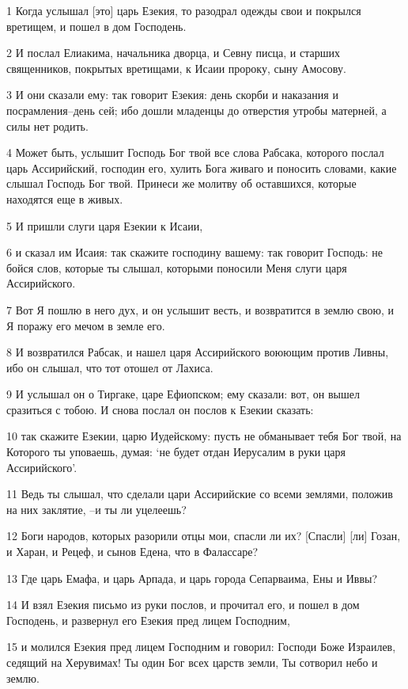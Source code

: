 \par 1 Когда услышал [это] царь Езекия, то разодрал одежды свои и покрылся вретищем, и пошел в дом Господень.
\par 2 И послал Елиакима, начальника дворца, и Севну писца, и старших священников, покрытых вретищами, к Исаии пророку, сыну Амосову.
\par 3 И они сказали ему: так говорит Езекия: день скорби и наказания и посрамления--день сей; ибо дошли младенцы до отверстия утробы матерней, а силы нет родить.
\par 4 Может быть, услышит Господь Бог твой все слова Рабсака, которого послал царь Ассирийский, господин его, хулить Бога живаго и поносить словами, какие слышал Господь Бог твой. Принеси же молитву об оставшихся, которые находятся еще в живых.
\par 5 И пришли слуги царя Езекии к Исаии,
\par 6 и сказал им Исаия: так скажите господину вашему: так говорит Господь: не бойся слов, которые ты слышал, которыми поносили Меня слуги царя Ассирийского.
\par 7 Вот Я пошлю в него дух, и он услышит весть, и возвратится в землю свою, и Я поражу его мечом в земле его.
\par 8 И возвратился Рабсак, и нашел царя Ассирийского воюющим против Ливны, ибо он слышал, что тот отошел от Лахиса.
\par 9 И услышал он о Тиргаке, царе Ефиопском; ему сказали: вот, он вышел сразиться с тобою. И снова послал он послов к Езекии сказать:
\par 10 так скажите Езекии, царю Иудейскому: пусть не обманывает тебя Бог твой, на Которого ты уповаешь, думая: `не будет отдан Иерусалим в руки царя Ассирийского'.
\par 11 Ведь ты слышал, что сделали цари Ассирийские со всеми землями, положив на них заклятие, --и ты ли уцелеешь?
\par 12 Боги народов, которых разорили отцы мои, спасли ли их? [Спасли] [ли] Гозан, и Харан, и Рецеф, и сынов Едена, что в Фалассаре?
\par 13 Где царь Емафа, и царь Арпада, и царь города Сепарваима, Ены и Иввы?
\par 14 И взял Езекия письмо из руки послов, и прочитал его, и пошел в дом Господень, и развернул его Езекия пред лицем Господним,
\par 15 и молился Езекия пред лицем Господним и говорил: Господи Боже Израилев, седящий на Херувимах! Ты один Бог всех царств земли, Ты сотворил небо и землю.
